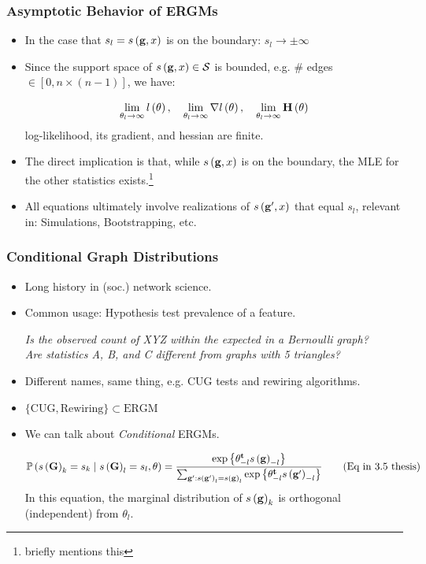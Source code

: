 \documentclass[aspectratio=169, 9pt]{beamer}
\begin{document}
\begin{frame}
\frametitle{Asymptotic Behavior of ERGMs}

\begin{itemize}
\item In the case that $s_l = s\left(\mathbf{g}, x\right)$ is on the boundary: $s_l \to \pm\infty$\pause
\item Since the support space of $s\left(\mathbf{g}, x\right)\in\mathcal{S}$ is bounded, e.g. \# edges $\in [0,n\times (n - 1)]$, we have: \pause

\begin{equation*}
\lim_{\theta_l\to\infty}\loglik{\theta}, \quad %
\lim_{\theta_l\to\infty}\nabla\loglik{\theta}, \quad %
\lim_{\theta_l\to\infty}\mathbf{H}\left(\theta\right)
\end{equation*}
log-likelihood, its gradient, and hessian are finite.\pause
\item The direct implication is that, while $s\left(\mathbf{g}, x\right)$ is on the boundary, the MLE for the other statistics exists.\footnote{\cite{Handcock2003} briefly mentions this}\pause
\item All equations ultimately involve realizations of $s\left(\mathbf{g}', x\right)$ that equal $s_l$, relevant in: Simulations, Bootstrapping, etc.
\end{itemize}


\end{frame}

\begin{frame}
\frametitle{Conditional Graph Distributions}

\begin{itemize}
	\item Long history in (soc.) network science.\pause
	\item Common usage: Hypothesis test prevalence of a feature.\pause{}
	\begin{center}\it
	Is the observed count of XYZ within the expected in a \alert{Bernoulli graph}? \\ \pause{}
	Are statistics A, B, and C different from \alert{graphs with 5 triangles}?
	\end{center}
	\item Different names, same thing, e.g. CUG tests and rewiring algorithms.\pause
	\item $\{\mbox{CUG}, \mbox{Rewiring}\}\subset \mbox{ERGM}$\pause
	\item We can talk about \textit{Conditional} ERGMs.
	
	\begin{equation*}
	\Prcond{\sufstats{\Graph}_k = s_k}{\sufstats{\Graph}_l = s_l, \theta} = %
	\frac{%
		\exp{\transpose{\theta}_{-l}\sufstats{\graph}_{-l}}
	}{%
		\sum_{\graph': \sufstats{\graph'}_l = \sufstats{\graph}_l}\exp{\transpose{\theta}_{-l}\sufstats{\graph'}_{-l}}
	}\tag{Eq in 3.5 thesis}
	\end{equation*}
	\pause In this equation, the marginal distribution of $s\left(\mathbf{g}\right)_k$ is orthogonal (independent) from $\theta_l$.
	
	
\end{itemize}



\end{frame}
\end{document}
